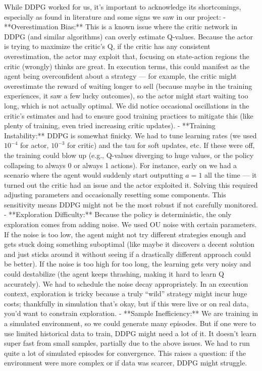 \documentclass[11pt]{article}
\begin{document}
		While DDPG worked for us, it’s important to acknowledge its shortcomings, especially as found in literature and some signs we saw in our project:
		- **Overestimation Bias:** This is a known issue where the critic network in DDPG (and similar algorithms) can overly estimate Q-values. Because the actor is trying to maximize the critic’s Q, if the critic has any consistent overestimation, the actor may exploit that, focusing on state-action regions the critic (wrongly) thinks are great. In execution terms, this could manifest as the agent being overconfident about a strategy — for example, the critic might overestimate the reward of waiting longer to sell (because maybe in the training experiences, it saw a few lucky outcomes), so the actor might start waiting too long, which is not actually optimal. We did notice occasional oscillations in the critic’s estimates and had to ensure good training practices to mitigate this (like plenty of training, even tried increasing critic updates).
		- **Training Instability:** DDPG is somewhat finicky. We had to tune learning rates (we used $10^{-4}$ for actor, $10^{-3}$ for critic) and the tau for soft updates, etc. If these were off, the training could blow up (e.g., Q-values diverging to huge values, or the policy collapsing to always 0 or always 1 actions). For instance, early on we had a scenario where the agent would suddenly start outputting $a=1$ all the time — it turned out the critic had an issue and the actor exploited it. Solving this required adjusting parameters and occasionally resetting some components. This sensitivity means DDPG might not be the most robust if not carefully monitored.
		- **Exploration Difficulty:** Because the policy is deterministic, the only exploration comes from adding noise. We used OU noise with certain parameters. If the noise is too low, the agent might not try different strategies enough and gets stuck doing something suboptimal (like maybe it discovers a decent solution and just sticks around it without seeing if a drastically different approach could be better). If the noise is too high for too long, the learning gets very noisy and could destabilize (the agent keeps thrashing, making it hard to learn Q accurately). We had to schedule the noise decay appropriately. In an execution context, exploration is tricky because a truly “wild” strategy might incur huge costs; thankfully in simulation that’s okay, but if this were live or on real data, you’d want to constrain exploration.
		- **Sample Inefficiency:** We are training in a simulated environment, so we could generate many episodes. But if one were to use limited historical data to train, DDPG might need a lot of it. It doesn’t learn super fast from small samples, partially due to the above issues. We had to run quite a lot of simulated episodes for convergence. This raises a question: if the environment were more complex or if data was scarcer, DDPG might struggle. 
		
\end{document}
